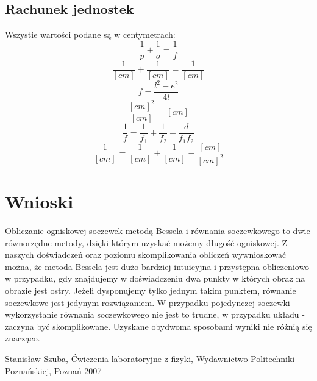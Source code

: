 \documentclass[polish,a4paper]{article}
\begin{document}
\subsection{Rachunek jednostek}
Wszystie wartości podane są w centymetrach:
$$\frac{1}{p} + \frac{1}{o} = \frac{1}{f}$$
$$\frac{1}{[cm]} + \frac{1}{[cm]} = \frac{1}{[cm]}$$
$$ f = \frac{l^2-e^2}{4l} $$
$$\frac{[cm]^2}{[cm]}=[cm]$$
$$\frac{1}{f} = \frac{1}{f_1} + \frac{1}{f_2} - \frac{d}{f_1f_2}$$
$$\frac{1}{[cm]} = \frac{1}{[cm]} + \frac{1}{[cm]} - \frac{[cm]}{[cm]^2}$$


\section{Wnioski}
Obliczanie ogniskowej soczewek metodą Bessela i równania soczewkowego to dwie równorzędne metody, dzięki którym uzyskać możemy długość ogniskowej. Z naszych doświadczeń oraz poziomu skomplikowania obliczeń wywnioskować można, że metoda Bessela jest dużo bardziej intuicyjna i przystępna obliczeniowo w przypadku, gdy znajdujemy w doświadczeniu dwa punkty w których obraz na obrazie jest ostry. Jeżeli dysponujemy tylko jednym takim punktem, równanie soczewkowe jest jedynym rozwiązaniem. W przypadku pojedynczej soczewki wykorzystanie równania soczewkowego nie jest to trudne, w przypadku układu - zaczyna być skomplikowane. Uzyskane obydwoma sposobami wyniki nie różnią się znacząco.

\begin{thebibliography}{1}
 Stanisław Szuba, Ćwiczenia laboratoryjne z fizyki, Wydawnictwo Politechniki Poznańskiej, Poznań 2007
\end{thebibliography}
\end{document}
